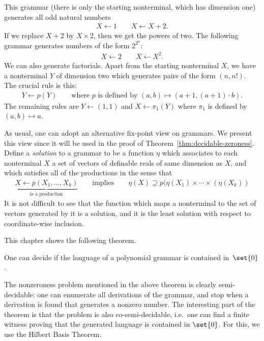 \begin{example}
	This grammar (there is only the starting nonterminal, which has dimension one) generates all odd natural numbers
	\begin{align*}
  X \leftarrow 1 \qquad X \leftarrow X+2.
\end{align*}
If we replace $X+2$ by $X \times 2$, then we get the powers of two. The following grammar generates numbers of the form $2^{2^n}$:
	\begin{align*}
  X \leftarrow 2 \qquad X \leftarrow X^2.
\end{align*}
We can also generate  factorials. Apart from the starting nonterminal $X$, we have a nonterminal $Y$ of dimension two which generates pairs of the form $(n,n!)$.  The crucial rule is this:
\begin{align*}
  Y \leftarrow p(Y) \qquad \mbox{where $p$ is defined by }(a,b) \mapsto (a+1,(a+1) \cdot b).
\end{align*}
The remaining rules are $Y \leftarrow (1,1)$ and $X \leftarrow \pi_1(Y)$ where $\pi_1$ is defined by $(a,b) \mapsto a$.
\end{example}

As usual, one can adopt an alternative fix-point view on grammars. We present this view since it will be used in the proof of Theorem~\ref{thm:decidable-zeroness}.
Define a \emph{solution} to  a grammar to be a function $\eta$ which associates to  each nonterminal $X$ a set of vectors of definable reals of same dimension as $X$, and 
which satisfies all of the productions in the sense that 
\begin{align*}
  \underbrace{X \leftarrow p(X_1,\ldots,X_k)}_{\text{is a production}} \qquad \mbox{implies} \qquad \eta(X) \supseteq p(\eta(X_1) \times \cdots \times(\eta(X_k))
\end{align*}
It is not difficult to see that the function which maps a nonterminal to the set of vectors generated by it 
is a solution, and it is the least solution with respect to coordinate-wise inclusion.

This chapter shows the following theorem.
\begin{theorem}\label{thm:decidable-zeroness}
One can decide if the language of a polynomial grammar is contained in~$\set{0}$. 
\end{theorem}

The nonzeroness problem mentioned in the above theorem is clearly semi-decidable: one can  enumerate all derivations of the grammar, and stop when a derivation is found that generates a nonzero number. The interesting part of the theorem is that the problem is also co-semi-decidable, i.e.~one can find a  finite witness proving that the generated language is contained in $\set{0}$. For this, we use the Hilbert Basis Theorem.



